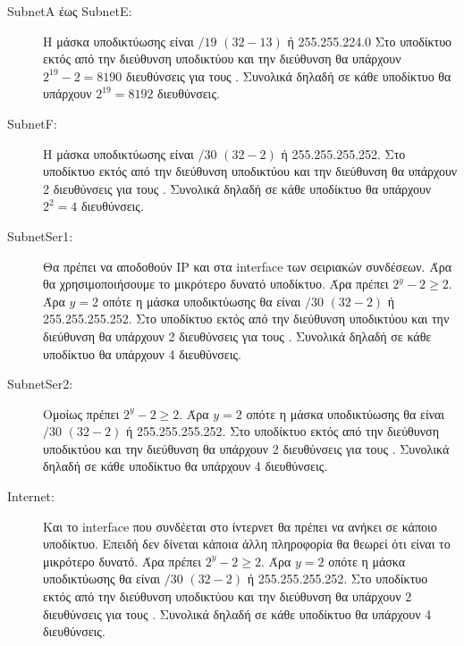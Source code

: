 \documentclass{assignment}
\begin{document}
\begin{description}
\item[SubnetA έως SubnetE:] H μάσκα υποδικτύωσης είναι $/19$ $(32-13)$ ή 255.255.224.0 Στο υποδίκτυο εκτός από την διεύθυνση υποδικτύου και την  διεύθυνση θα υπάρχουν $2^{19} - 2 = 8190$ διευθύνσεις για τους . Συνολικά δηλαδή σε κάθε υποδίκτυο θα υπάρχουν $2^{19} = 8192$ διευθύνσεις.

\item[SubnetF:] H μάσκα υποδικτύωσης είναι $/30$ $(32-2)$ ή 255.255.255.252. Στο υποδίκτυο εκτός από την διεύθυνση υποδικτύου και την  διεύθυνση θα υπάρχουν 2 διευθύνσεις για τους . Συνολικά δηλαδή σε κάθε υποδίκτυο θα υπάρχουν $2^2 = 4$ διευθύνσεις.

\item[SubnetSer1:] Θα πρέπει να αποδοθούν IP και στα interface των σειριακών συνδέσεων. Άρα θα χρησιμοποιήσουμε το μικρότερο δυνατό υποδίκτυο. Άρα πρέπει $2^y -2 \geq 2$. Άρα $y=2$ οπότε η μάσκα υποδικτύωσης θα είναι $/30$ $(32-2)$ ή 255.255.255.252. Στο υποδίκτυο εκτός από την διεύθυνση υποδικτύου και την  διεύθυνση θα υπάρχουν 2 διευθύνσεις για τους . Συνολικά δηλαδή σε κάθε υποδίκτυο θα υπάρχουν 4 διευθύνσεις.

\item[SubnetSer2:] Ομοίως πρέπει $2^y -2 \geq 2$. Άρα $y=2$ οπότε η μάσκα υποδικτύωσης θα είναι $/30$ $(32-2)$ ή 255.255.255.252. Στο υποδίκτυο εκτός από την διεύθυνση υποδικτύου και την  διεύθυνση θα υπάρχουν 2 διευθύνσεις για τους . Συνολικά δηλαδή σε κάθε υποδίκτυο θα υπάρχουν 4 διευθύνσεις.

\item[Internet:] Και το interface που συνδέεται στο ίντερνετ θα πρέπει να ανήκει σε κάποιο υποδίκτυο. Επειδή δεν δίνεται κάποια άλλη πληροφορία θα θεωρεί ότι είναι το μικρότερο δυνατό. Άρα πρέπει $2^y -2 \geq 2$. Άρα $y=2$ οπότε η μάσκα υποδικτύωσης θα είναι $/30$ $(32-2)$ ή 255.255.255.252. Στο υποδίκτυο εκτός από την διεύθυνση υποδικτύου και την  διεύθυνση θα υπάρχουν 2 διευθύνσεις για τους . Συνολικά δηλαδή σε κάθε υποδίκτυο θα υπάρχουν 4 διευθύνσεις.


\end{description}
\end{document}
